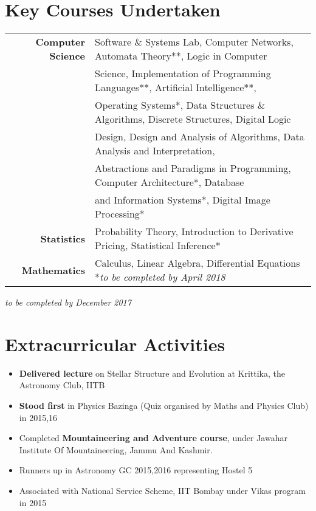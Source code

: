 \documentclass[a4paper,10pt]{article}
\begin{document}
\section{Key Courses Undertaken}
\begin{tabular}{rl}

\textbf{Computer Science} & Software \& Systems Lab, Computer Networks, Automata Theory**, Logic in Computer
\\  & Science, Implementation of Programming Languages**, Artificial Intelligence**, 
\\ & Operating Systems*, Data Structures \& Algorithms, Discrete Structures, Digital Logic
\\ & Design, Design and Analysis of Algorithms,  Data Analysis and Interpretation,  
\\ & Abstractions and Paradigms in Programming, Computer Architecture*, Database
\\ & and Information Systems*, Digital Image Processing*\\
    \textbf{Statistics} & Probability Theory, Introduction to Derivative Pricing, Statistical Inference* \\
	\textbf{Mathematics} & Calculus, Linear Algebra, Differential Equations \hfill **{\it to be completed by April 2018}\\
 \end{tabular}
   \hspace*{110mm}\hfill{{\sl *{\it to be completed by December 2017}}}
\vspace{-15pt}
\section{Extracurricular Activities}
\begin{itemize}
    \item \textbf{Delivered lecture} on Stellar Structure and Evolution at Krittika, the Astronomy Club, IITB
    \item \textbf{Stood first} in Physics Bazinga (Quiz organised by Maths and Physics Club) in 2015,16
    \item Completed \textbf{Mountaineering and Adventure course}, under Jawahar Institute Of Mountaineering, Jammu And Kashmir.
    \item Runners up in Astronomy GC 2015,2016 representing Hostel 5
    \item Associated with National Service Scheme, IIT Bombay under Vikas program in 2015
\end{itemize}
\end{document}
